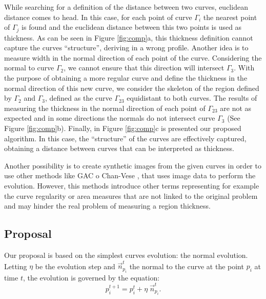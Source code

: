 \documentclass{article}
\begin{document}
While searching for a definition of the distance between two curves, euclidean distance comes to head. In this case, for each point of curve $\Gamma_i$ the nearest point of $\Gamma_j$ is found and the euclidean distance between this two points is used as thickness. As can be seen in Figure \ref{fig:comp}a, this thickness definition cannot capture the curves ``structure'', deriving in a wrong profile. Another idea is to measure width in the normal direction of each point of the curve. Considering the normal to curve $\Gamma_2$, we cannot ensure that this direction will intersect $\Gamma_3$. With the purpose of obtaining a more regular curve and define the thickness in the normal direction of this new curve, we consider the skeleton of the region defined by $\Gamma_2$ and $\Gamma_3$, defined as the curve $\Gamma_{23}$ equidistant to both curves. The results of measuring the thickness in the normal direction of each point of $\Gamma_{23}$ are not as expected and in some directions the normals do not intersect curve $\Gamma_3$ (See Figure \ref{fig:comp}b). Finally, in Figure \ref{fig:comp}c is presented our proposed algorithm. In this case, the ``structure'' of the curves are effectively captured, obtaining a distance between curves that can be interpreted as thickness.

Another possibility is to create synthetic images from the given curves in order to use other methods like GAC \cite{gac} o Chan-Vese \cite{chan-vese}, that uses image data to perform the evolution. However, this methods introduce other terms representing for example the curve regularity or area measures that are not linked to the original problem and may hinder the real problem of measuring a region thickness. 

\subsection{Proposal}
\label{ssec:proposal}
Our proposal is based on the simplest curves evolution: the normal evolution. Letting $\eta$ be the evolution step and $\vec{n}_{p_i}^t$ the normal to the curve at the point $p_i$ at time $t$, the evolution is governed by the equation:
\begin{equation}
  p_i^{t+1}=p_i^t+\eta \; \vec{n}_{p_i}^t.
  \label{ec:normal}
\end{equation}
\end{document}
